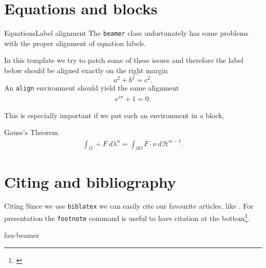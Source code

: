 \section{Equations and blocks}
%
%
%
%
%
\begin{frame}{Equations}{Label alignment}
	The \texttt{beamer} class unfortunately has some problems with the proper
	alignment of equation labels.

	\pause
	In this template we try to patch some of these issues and therefore the label
	below should be aligned exactly on the right margin
	\begin{equation}\label{eq:pythagoras}
		a^2 + b^2 = c^2.
	\end{equation}
	An \texttt{align} environment should yield the same alignment
	\begin{align}\label{eq:euler}
		e^{i\pi} +1= 0.
	\end{align}

	This is especially important if we put such an environment in a block,

	\begin{block}{Gauss's Theorem}
		\begin{align}\label{eq:gauss}
			\int_\Omega \div F\ d\lambda^n = \int_{\partial\Omega} F\cdot \nu\ d\mathcal{H}^{n-1}.
		\end{align}
	\end{block}
\end{frame}
\section{Citing and bibliography}
%
%
%
%
%
\begin{frame}{Citing}
	Since we use \texttt{biblatex} we can easily cite our favourite articles, like
	\cite{Floratou2019, Furche2016}. For presentation the \texttt{footnote} command is useful to have citation at the bottom\footnote{\cite{jvalue:jayvee}}.
\end{frame}
%
%
%
%
%
%
%
%
%
%
\begin{frame}{fau-beamer}
\end{frame}
